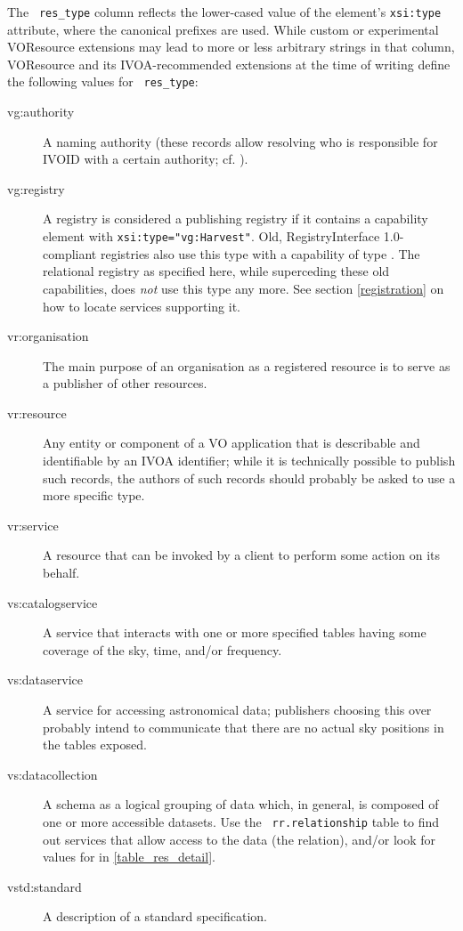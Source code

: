 \documentclass[11pt,a4paper]{ivoa}
\newcommand{\rtent}[1]{\texttt{\color{rtcolor} #1}}
\begin{document}
The \rtent{res\_type} column reflects the lower-cased value of
the  element's \texttt{xsi:type} attribute,
where the canonical prefixes are used.  While custom or experimental
VOResource extensions may lead to more or less arbitrary strings in that
column, VOResource and its IVOA-recommended extensions at the time of
writing define the following values for \rtent{res\_type}:


\begin{description}
\item[vg:authority]A naming authority (these records allow resolving who is responsible
for IVOID with a certain authority; cf. \citet{std:VOID}).
\item[vg:registry]A registry is considered a publishing registry if it contains a
capability element with \texttt{xsi:type="vg:Harvest"}.  Old,
RegistryInterface 1.0-compliant registries also use this type with a
capability of type .  The relational registry as
specified here, while superceding these old 
capabilities, does \emph{not} use this type any more.  See section
\ref{registration} on how to locate services
supporting it.
\item[vr:organisation]The main purpose of an organisation as a registered resource is to
serve as a publisher of other resources.
\item[vr:resource]Any entity or component of a VO application that is describable and
identifiable by an IVOA identifier; while it is technically possible to
publish such records, the authors of such records should probably be
asked to use a more specific type.
\item[vr:service]A resource that can be invoked by a client to perform some action on
its behalf.
\item[vs:catalogservice]A service that interacts with one or more specified tables having
some coverage of the sky, time, and/or frequency.
\item[vs:dataservice]A service for accessing astronomical data; publishers choosing
this over  probably intend to communicate
that there are no actual sky positions in the tables exposed.
\item[vs:datacollection]A schema as a logical grouping of data which, in general, is
composed of one or more accessible datasets.  Use the
\rtent{rr.relationship} table to find out services that allow
access to the data (the  relation), and/or look for values for
 in
\ref{table_res_detail}.
\item[vstd:standard]A description of a standard specification.

\end{description}
\end{document}
